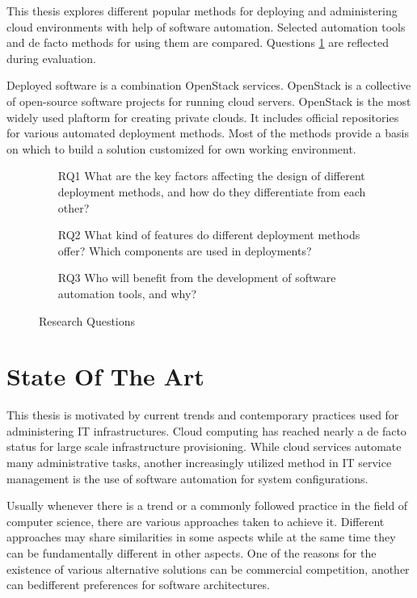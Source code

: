 \documentclass[officiallayout]{tktla}
\begin{document}
This thesis explores different popular methods for deploying and administering
cloud environments with help of software automation. Selected automation tools
and de facto methods for using them are compared. Questions \ref{fig:rqs} are
reflected during evaluation.

Deployed software is a combination OpenStack services. OpenStack is a
collective of open-source software projects for running cloud servers.
OpenStack is the most widely used plaftorm for creating private clouds. It
includes official repositories for various automated deployment methods. Most
of the methods provide a basis on which to build a solution customized for own
working environment.

\begin{figure}[t]
\centering
\begin{itemize}
  \item [RQ1] What are the key factors affecting the design of different
              deployment methods, and how do they differentiate from each
              other?
  \item [RQ2] What kind of features do different deployment methods offer?
              Which components are used in deployments?
  \item [RQ3] Who will benefit from the development of software automation
              tools, and why?
\end{itemize}
\caption{Research Questions}
\label{fig:rqs}
\end{figure}

\chapter{State Of The Art}

This thesis is motivated by current trends and contemporary practices used for
administering IT infrastructures. Cloud computing has reached nearly a de facto
status for large scale infrastructure provisioning. While cloud services
automate many administrative tasks, another increasingly utilized method in IT
service management is the use of software automation for system configurations.

Usually whenever there is a trend or a commonly followed practice in the field
of computer science, there are various approaches taken to achieve it.
Different approaches may share similarities in some aspects while at the same
time they can be fundamentally different in other aspects. One of the reasons
for the existence of various alternative solutions can be commercial
competition, another can bedifferent preferences for software architectures.
\end{document}
